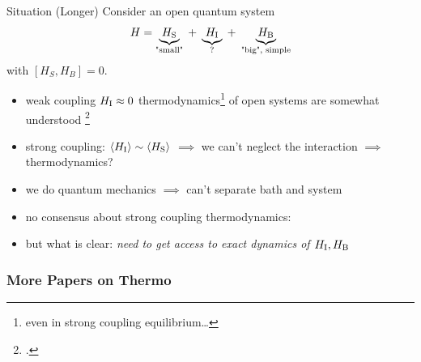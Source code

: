 \documentclass[10pt, aspectratio=169]{beamer}
\begin{document}
\begin{frame}
  \begin{block}{Situation (Longer)}
    Consider an open quantum system
    \begin{equation}
      \label{eq:openthermo}
      H=\underbrace{H_{\mathrm{S}}}_{\text{"small"}}\; +\;
      \underbrace{H_{\mathrm{I}}}_{\mathrm{?}} \;+\;
      \underbrace{H_{\mathrm{B}}}_{\text{"big", simple}}
    \end{equation}
    with \([H_S, H_B] = 0\).
  \end{block}
  \pause
  \begin{itemize}[<+->]
  \item weak coupling \(H_{\mathrm{I}}\approx 0\)
    thermodynamics\footnote{even in strong coupling equilibrium\ldots{}} of open systems
    are somewhat understood \footcite{Rivas2019Oct,Talkner2020Oct}
  \item strong coupling: \(\ev{H_\inter} \sim \ev{H_\sys}\)
    \(\implies\) we can't neglect the interaction \(\implies\)
    thermodynamics?
  \item we do quantum mechanics \(\implies\) can't separate bath
    and system
  \item no consensus about strong coupling thermodynamics:
  \item but what is clear: \emph{need to get access to exact dynamics
      of \(H_{\mathrm{I}},H_{\mathrm{B}}\)}
  \end{itemize}
\end{frame}

\begin{frame}
  \frametitle{More Papers on Thermo}
  \cite{Rivas2019Oct,Talkner2020Oct,Motz2018Nov,Wiedmann2020Mar,Senior2020Feb,Kato2015Aug,Kato2016Dec,Strasberg2021Aug,Talkner2016Aug,Bera2021Feb,Bera2021Jun,Esposito2015Dec}
\end{frame}
\end{document}
